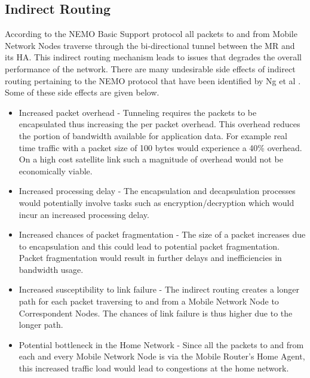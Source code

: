 \subsection{Indirect Routing}

According to the NEMO Basic Support protocol all packets to and from Mobile
Network Nodes traverse through the bi-directional tunnel between the MR and
its HA. This indirect routing mechanism leads to issues that degrades the
overall performance of the network. There are many undesirable side effects of
indirect routing pertaining to the NEMO protocol that have been identified
by Ng et al \cite{14}. Some of these side effects are given below.

\begin{itemize}
\item Increased packet overhead - Tunneling requires the packets to be
encapsulated thus increasing the per packet overhead. This overhead reduces
the portion of bandwidth available for application data. For example real time
traffic with a packet size of 100 bytes would experience a 40\% overhead. On a
high cost satellite link such a magnitude of overhead would not be
economically viable.

\item Increased processing delay - The encapsulation and decapsulation
processes would potentially involve tasks such as encryption/decryption which
would incur an increased processing delay.

\item Increased chances of packet fragmentation - The size of a packet
increases due to encapsulation and this could lead to potential packet
fragmentation. Packet fragmentation would result in further delays and
inefficiencies in bandwidth usage.

\item Increased susceptibility to link failure - The indirect routing creates
a longer path for each packet traversing to and from a Mobile Network Node to
Correspondent Nodes. The chances of link failure is thus higher due to the
longer path.

\item Potential bottleneck in the Home Network - Since all the packets to and
from each and every Mobile Network Node is via the Mobile Router's Home Agent,
this increased traffic load would lead to congestions at the home network.
\end{itemize}

